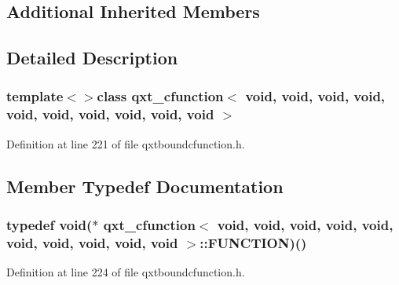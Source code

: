 \subsection*{Additional Inherited Members}


\subsection{Detailed Description}
\subsubsection*{template$<$$>$class qxt\-\_\-cfunction$<$ void, void, void, void, void, void, void, void, void, void $>$}



Definition at line 221 of file qxtboundcfunction.\-h.



\subsection{Member Typedef Documentation}
\hypertarget{classqxt__cfunction_3_01void_00_01void_00_01void_00_01void_00_01void_00_01void_00_01void_00_01void_00_01void_00_01void_01_4_abe6a1af742943a625e251ad456e23f33}{
\subsubsection[{F\-U\-N\-C\-T\-I\-O\-N}]{\setlength{\rightskip}{0pt plus 5cm}typedef {\bf void}($\ast$ {\bf qxt\-\_\-cfunction}$<$ {\bf void}, {\bf void}, {\bf void}, {\bf void}, {\bf void}, {\bf void}, {\bf void}, {\bf void}, {\bf void}, {\bf void} $>$\-::F\-U\-N\-C\-T\-I\-O\-N)()}}\label{classqxt__cfunction_3_01void_00_01void_00_01void_00_01void_00_01void_00_01void_00_01void_00_01void_00_01void_00_01void_01_4_abe6a1af742943a625e251ad456e23f33}


Definition at line 224 of file qxtboundcfunction.\-h.



